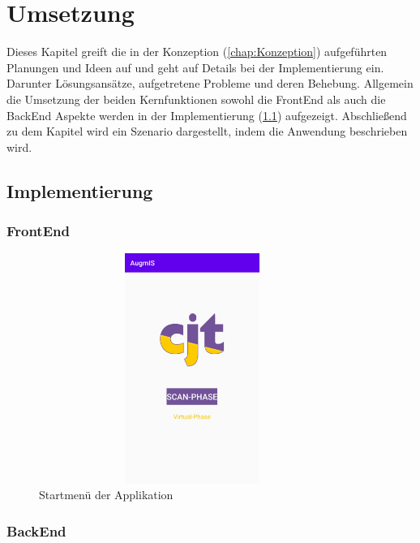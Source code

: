 

\chapter{Umsetzung}
\label{chap:Umsetzung}
Dieses Kapitel greift die in der Konzeption (\ref{chap:Konzeption}) aufgeführten Planungen und Ideen auf und geht auf Details bei der 
Implementierung ein. Darunter Lösungsansätze, aufgetretene Probleme und deren Behebung. Allgemein die Umsetzung der beiden Kernfunktionen 
sowohl die FrontEnd als auch die BackEnd Aspekte werden in der Implementierung (\ref{chap:implementierung}) aufgezeigt. Abschließend zu 
dem Kapitel wird ein Szenario dargestellt, indem die Anwendung beschrieben wird.

\section{Implementierung}
\label{chap:implementierung}
\subsection*{FrontEnd}
\begin{figure}[hbt!]
    \centering
    \includegraphics[width=10cm,height=7.5cm,keepaspectratio]{4Umsetzung/Bilder/startmenu.jpg}
    \caption{Startmenü der Applikation}
    \label{pic:startmenu}
\end{figure}
\subsection*{BackEnd}

